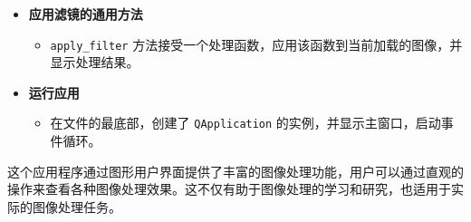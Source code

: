 \documentclass[a4paper,12pt]{article}
\begin{document}
\begin{itemize}
    \item \textbf{应用滤镜的通用方法}
    \begin{itemize}
        \item \texttt{apply\_filter} 方法接受一个处理函数，应用该函数到当前加载的图像，并显示处理结果。
    \end{itemize}

    \item \textbf{运行应用}
    \begin{itemize}
        \item 在文件的最底部，创建了 \texttt{QApplication} 的实例，并显示主窗口，启动事件循环。
    \end{itemize}
\end{itemize}

这个应用程序通过图形用户界面提供了丰富的图像处理功能，用户可以通过直观的操作来查看各种图像处理效果。这不仅有助于图像处理的学习和研究，也适用于实际的图像处理任务。
\end{document}
